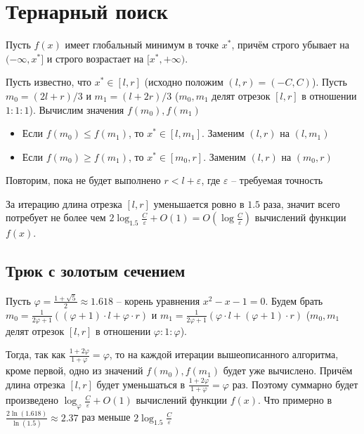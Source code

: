\section{Тернарный поиск}

Пусть $f(x)$ имеет глобальный минимум в точке $x^*$,
причём строго убывает на $(-\infty, x^*]$ и строго возрастает на $[x^*, +\infty)$.

Пусть известно, что $x^* \in [l, r]$ (исходно положим $(l, r) =  (-C, C)$).
Пусть $m_0 = (2l + r) / 3$ и $m_1 = (l + 2r) / 3$ ($m_0, m_1$ делят отрезок $[l, r]$ в отношении $1:1:1$).
Вычислим значения $f(m_0), f(m_1)$
\begin{itemize}
    \item Если $f(m_0) \le f(m_1)$, то $x^* \in [l, m_1]$. Заменим $(l, r)$ на $(l, m_1)$
    \item Если $f(m_0) \ge f(m_1)$, то $x^* \in [m_0, r]$. Заменим $(l, r)$ на $(m_0, r)$
\end{itemize}
Повторим, пока не будет выполнено $r < l + \varepsilon$, где $\varepsilon$ -- требуемая точность

За итерацию длина отрезка $[l, r]$ уменьшается ровно в $1.5$ раза,
значит всего потребует не более чем $2 \log_{1.5} \frac{C}{\varepsilon} + O(1) = O(\log \frac{C}{\varepsilon})$ вычислений функции $f(x)$.


\subsection{Трюк с золотым сечением}

Пусть $\varphi = \frac{1 + \sqrt{5}}{2} \approx 1.618$ -- корень уравнения $x^2 - x - 1 = 0$.
Будем брать
$m_0 = \frac{1}{2\varphi + 1}\left((\varphi + 1) \cdot l + \varphi \cdot r \right)$
и
$m_1 = \frac{1}{2\varphi + 1}\left(\varphi \cdot l + (\varphi + 1) \cdot r \right)$
($m_0, m_1$ делят отрезок $[l, r]$ в отношении $ \varphi : 1 : \varphi$).

Тогда, так как $\frac{1 + 2\varphi}{1 + \varphi} = \varphi$, то на каждой итерации вышеописанного алгоритма, кроме первой,
одно из значений $f(m_0), f(m_1)$ будет уже вычислено.
Причём длина отрезка $[l, r]$ будет уменьшаться в $\frac{1 + 2\varphi}{1 + \varphi} = \varphi$ раз.
Поэтому суммарно будет произведено $\log_{\varphi} \frac{C}{\varepsilon} + O(1)$ вычислений функции $f(x)$.
Что примерно в $\frac{2\ln(1.618)}{\ln(1.5)} \approx 2.37$ раз меньше $2\log_{1.5} \frac{C}{\varepsilon}$
